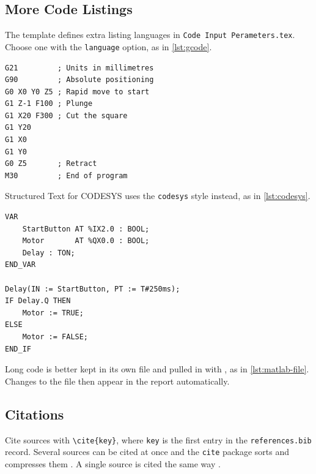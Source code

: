 \subsection{More Code Listings}

The template defines extra listing languages in
\texttt{Code Input Perameters.tex}. Choose one with the \verb|language|
option, as in \cref{lst:gcode}.

\begin{lstlisting}[language=GCode, caption={G-code to cut a square.}, label={lst:gcode}]
G21         ; Units in millimetres
G90         ; Absolute positioning
G0 X0 Y0 Z5 ; Rapid move to start
G1 Z-1 F100 ; Plunge
G1 X20 F300 ; Cut the square
G1 Y20
G1 X0
G1 Y0
G0 Z5       ; Retract
M30         ; End of program
\end{lstlisting}

Structured Text for CODESYS uses the \verb|codesys| style instead, as in
\cref{lst:codesys}.

\begin{lstlisting}[style=codesys, caption={CODESYS Structured Text.}, label={lst:codesys}]
VAR
    StartButton AT %IX2.0 : BOOL;
    Motor       AT %QX0.0 : BOOL;
    Delay : TON;
END_VAR

Delay(IN := StartButton, PT := T#250ms);
IF Delay.Q THEN
    Motor := TRUE;
ELSE
    Motor := FALSE;
END_IF
\end{lstlisting}

Long code is better kept in its own file and pulled in with
\verb||, as in \cref{lst:matlab-file}. Changes to the file
then appear in the report automatically.



\subsection{Citations}

Cite sources with \verb|\cite{key}|, where \verb|key| is the first entry in
the \texttt{references.bib} record. Several sources can be cited at once
and the \texttt{cite} package sorts and compresses them
\cite{exampleBook,exampleConference,exampleStandard}. A single source is
cited the same way \cite{example2025}.

\cleardoublepage
